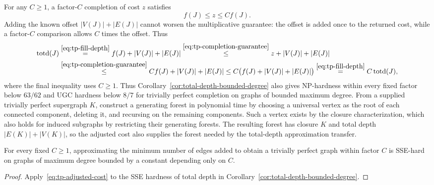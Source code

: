 For any $C\geq1$, a factor-$C$ completion of cost $z$ satisfies
\begin{equation}\label{eq:tp-completion-guarantee}
 f(J)\leq z\leq C f(J).
\end{equation}
Adding the known offset $|V(J)|+|E(J)|$ cannot worsen the
multiplicative guarantee: the offset is added once to the returned
cost, while a factor-$C$ comparison allows $C$ times the offset. Thus
\begin{equation}\label{eq:tp-adjusted-cost}
\begin{aligned}
 \operatorname{totd}(J)
  &\overset{\eqref{eq:tp-fill-depth}}{=}f(J)+|V(J)|+|E(J)|
 \overset{\eqref{eq:tp-completion-guarantee}}{\leq}z+|V(J)|+|E(J)|\\
 &\overset{\eqref{eq:tp-completion-guarantee}}{\leq}C f(J)+|V(J)|+|E(J)|
 \leq C\bigl(f(J)+|V(J)|+|E(J)|\bigr)
  \overset{\eqref{eq:tp-fill-depth}}{=}C\operatorname{totd}(J),
\end{aligned}
\end{equation}
where the final inequality uses $C\ge1$.
Thus Corollary~\ref{cor:total-depth-bounded-degree} also gives NP-hardness
within every fixed factor below $63/62$ and UGC hardness
below $8/7$ for trivially perfect completion on graphs of bounded
maximum degree. From a supplied trivially perfect supergraph $K$,
construct a generating forest in polynomial time by choosing a
universal vertex as the root of each connected component, deleting
it, and recursing on the remaining components. Such a vertex exists
by the closure characterization, which also holds for induced
subgraphs by restricting their generating forests. The resulting
forest has closure $K$ and total depth $|E(K)|+|V(K)|$, so the
adjusted cost also supplies the forest needed by the total-depth
approximation transfer.

\begin{theorem}\label{thm:tp-completion-sse}
For every fixed $C\ge1$, approximating the minimum number of edges
added to obtain a trivially perfect graph within factor $C$ is
SSE-hard on graphs of maximum degree bounded by a constant depending
only on $C$.
\end{theorem}

\begin{proof}
Apply~\eqref{eq:tp-adjusted-cost} to the SSE hardness of total
depth in Corollary~\ref{cor:total-depth-bounded-degree}.
\end{proof}

